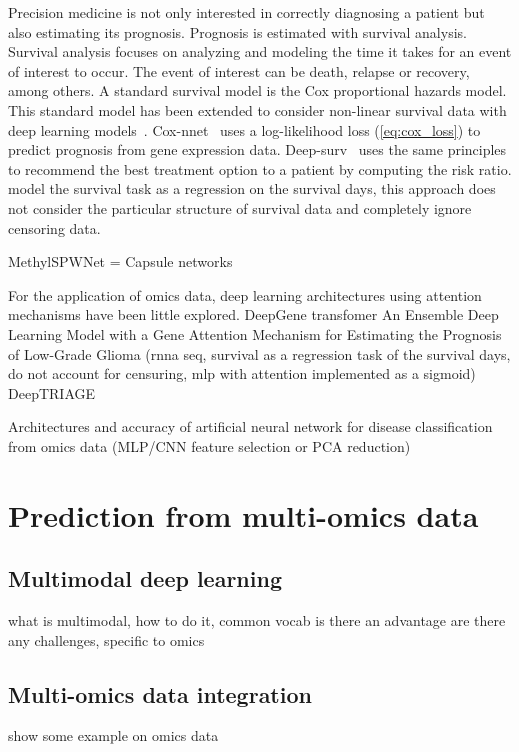 \documentclass[../main.tex]{subfiles}
\begin{document}
 Precision medicine is not only interested in correctly diagnosing a patient but also estimating its prognosis. 
 Prognosis is estimated with survival analysis. 
 Survival analysis focuses on analyzing and modeling the time it takes for an event of interest to occur. 
 The event of interest can be death, relapse or recovery, among others. 
 A standard survival model is the Cox proportional hazards model.
 This standard model has been extended to consider non-linear survival data with deep learning models~\cite{katzmanDeepSurvPersonalizedTreatment2018,Ching2018}. 
 Cox-nnet~\cite{Ching2018} uses a log-likelihood loss (\cref{eq:cox_loss}) to predict prognosis from gene expression data. 
 Deep-surv~\cite{katzmanDeepSurvPersonalizedTreatment2018} uses the same principles to recommend the best treatment option to a patient by computing the risk ratio. 
 \citeauthor{Lee2022} model the survival task as a regression on the survival days, this approach does not consider the particular structure of survival data and completely ignore censoring data. 
 
 



MethylSPWNet = Capsule networks
 
 For the application of omics data, deep learning architectures using attention mechanisms have been little explored.
 DeepGene transfomer
 An Ensemble Deep Learning Model with a Gene Attention Mechanism for Estimating the Prognosis of Low-Grade Glioma (rnna seq, survival as a regression task of the survival days, do not account for censuring, mlp with attention implemented as a sigmoid)
 DeepTRIAGE~\cite{beykikhoshkDeepTRIAGEInterpretableIndividualised2020a}
 
 
 Architectures and accuracy of artificial neural network for disease classification from omics data (MLP/CNN feature selection or PCA reduction)

\section{Prediction from multi-omics data}
 \subsection{Multimodal deep learning}
	 what is multimodal, how  to do it, common vocab
	 is there an advantage
	 are there any challenges, specific to omics
 \subsection{Multi-omics data integration}
	 show some example on omics data
\end{document}
